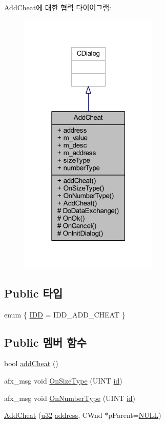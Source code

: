 Add\+Cheat에 대한 협력 다이어그램\+:\nopagebreak
\begin{figure}[H]
\begin{center}
\leavevmode
\includegraphics[width=187pt]{class_add_cheat__coll__graph}
\end{center}
\end{figure}
\subsection*{Public 타입}
\begin{DoxyCompactItemize}
\item 
enum \{ \mbox{\hyperlink{class_add_cheat_af696833b823db49de5667fcb42b11a26afedef0c6962fabc2ac997728fd544a12}{I\+DD}} = I\+D\+D\+\_\+\+A\+D\+D\+\_\+\+C\+H\+E\+AT
 \}
\end{DoxyCompactItemize}
\subsection*{Public 멤버 함수}
\begin{DoxyCompactItemize}
\item 
bool \mbox{\hyperlink{class_add_cheat_a53989b2f3f179185384d258c9e71ace7}{add\+Cheat}} ()
\item 
afx\+\_\+msg void \mbox{\hyperlink{class_add_cheat_ae9762fec683ccd9972d29fec47eecba4}{On\+Size\+Type}} (U\+I\+NT \mbox{\hyperlink{_commands_8cpp_a7b7a6396b2c82ad46c6d8b2bf141a8dd}{id}})
\item 
afx\+\_\+msg void \mbox{\hyperlink{class_add_cheat_a3ac4c44d5f9ec5037e92034789c276b4}{On\+Number\+Type}} (U\+I\+NT \mbox{\hyperlink{_commands_8cpp_a7b7a6396b2c82ad46c6d8b2bf141a8dd}{id}})
\item 
\mbox{\hyperlink{class_add_cheat_afa75eefc22d2f9449cf3b9283926408c}{Add\+Cheat}} (\mbox{\hyperlink{_system_8h_a10e94b422ef0c20dcdec20d31a1f5049}{u32}} \mbox{\hyperlink{class_add_cheat_ae21ae20b0a2e3b936b9ecbacb13a2751}{address}}, C\+Wnd $\ast$p\+Parent=\mbox{\hyperlink{_system_8h_a070d2ce7b6bb7e5c05602aa8c308d0c4}{N\+U\+LL}})
\end{DoxyCompactItemize}

